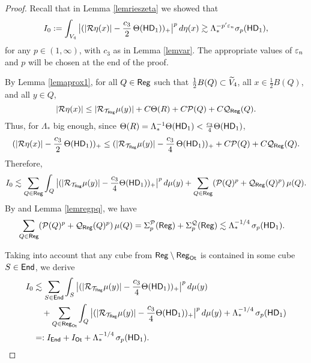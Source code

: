\begin{proof}
Recall that in Lemma \ref{lemrieszeta} we showed that  
\begin{equation}\label{eqI0038}
I_0:=\int_{V_4} \big|(|{\mathcal R}\eta(x)| - \frac{c_3}2\,\Theta({\mathsf{HD}}_1))_+\big|^p\,d\eta(x)
 \gtrsim \Lambda_*^{-p'{\varepsilon}_n}\sigma_p({\mathsf{HD}}_1),
\end{equation}
for any $p\in (1,\infty)$, with $c_3$ as in Lemma \ref{lemvar}.
The appropriate values of ${\varepsilon}_n$ and $p$ will be chosen at the end of the proof.


By Lemma \ref{lemaprox1}, for all $Q\in{\mathsf{Reg}}$ such that $\frac12B(Q)\subset{\widetilde{V}}_4$, all $x\in \frac12B(Q)$, and all $y\in Q$,
$$|{\mathcal R}\eta(x)| \leq |{\mathcal R}_{{\mathcal T}_{\mathsf{Reg}}}\mu(y)| + C\Theta(R) + C{\mathcal P}(Q) + C{\mathcal Q}_{\mathsf{Reg}}(Q).$$
Thus, for $\Lambda_*$ big enough, since $\Theta(R)=\Lambda_*^{-1}\Theta({\mathsf{HD}}_1)<\frac{c_3}4 \Theta({\mathsf{HD}}_1)$,
$$(|{\mathcal R}\eta(x)| - \frac{c_3}2 \,\Theta({\mathsf{HD}}_1))_+\leq
(|{\mathcal R}_{{\mathcal T}_{\mathsf{Reg}}}\mu(y)| - \frac{c_3}4\, \Theta({\mathsf{HD}}_1))_+  + C{\mathcal P}(Q) + C{\mathcal Q}_{\mathsf{Reg}}(Q).$$
Therefore,
$$
I_0  \lesssim \sum_{Q\in{\mathsf{Reg}}} \int_Q \big|(|{\mathcal R}_{{\mathcal T}_{\mathsf{Reg}}}\mu(y)| - 
\frac{c_3}4 \Theta({\mathsf{HD}}_1))_+\big|^{p}\,d\mu(y) + \sum_{Q\in{\mathsf{Reg}}} ({\mathcal P}(Q)^{p} + {\mathcal Q}_{\mathsf{Reg}}(Q)^{p})\,\mu(Q).$$
By  and Lemma \ref{lemregpq}, we have
\begin{align*}
\sum_{Q\in{\mathsf{Reg}}} ({\mathcal P}(Q)^{p} + {\mathcal Q}_{\mathsf{Reg}}(Q)^{p})\,\mu(Q) & = 
\Sigma_p^{\mathcal P}({\mathsf{Reg}}) +\Sigma_p^{\mathcal Q}({\mathsf{Reg}}) \lesssim \Lambda_*^{-1/4}\,\sigma_p({\mathsf{HD}}_1).
\end{align*}

Taking into account that any cube from ${\mathsf{Reg}}\setminus {\mathsf{Reg}}_{{\mathsf{Ot}}}$ 
is contained in some cube $S\in{\mathsf{End}}$, we derive
\begin{align}\label{eqI0**}
I_0  & \lesssim \sum_{S\in{\mathsf{End}}} \int_S \big|(|{\mathcal R}_{{\mathcal T}_{\mathsf{Reg}}}\mu(y)| - 
\frac{c_3}4 \Theta({\mathsf{HD}}_1))_+\big|^{p}\,d\mu(y) \\
&\quad
+ \sum_{Q\in{\mathsf{Reg}}_{{\mathsf{Ot}}}} \int_Q \big|(|{\mathcal R}_{{\mathcal T}_{\mathsf{Reg}}}\mu(y)| - 
\frac{c_3}4 \Theta({\mathsf{HD}}_1))_+\big|^{p}\,d\mu(y) + \Lambda_*^{-1/4}\,\sigma_p({\mathsf{HD}}_1)\nonumber\\
& =:I_{{\mathsf{End}}} + I_{\mathsf{Ot}} + \Lambda_*^{-1/4}\,\sigma_p({\mathsf{HD}}_1).\nonumber
\end{align}


\end{proof}
